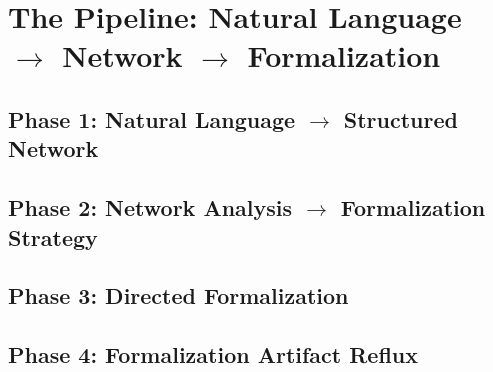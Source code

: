 \section{The Pipeline: Natural Language \texorpdfstring{$\to$}{→} Network \texorpdfstring{$\to$}{→} Formalization}
\label{sec:pipeline}


\subsection{Phase 1: Natural Language \texorpdfstring{$\to$}{→} Structured Network}
\label{sec:pipe-phase1}

%

\subsection{Phase 2: Network Analysis \texorpdfstring{$\to$}{→} Formalization Strategy}
\label{sec:pipe-phase2}


\subsection{Phase 3: Directed Formalization}
\label{sec:pipe-phase3}


\subsection{Phase 4: Formalization Artifact Reflux}
\label{sec:pipe-phase4}

